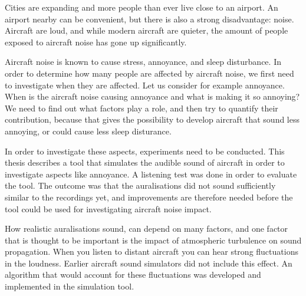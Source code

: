 Cities are expanding and more people than ever live close to an airport. An
airport nearby can be convenient, but there is also a strong disadvantage:
noise. Aircraft are loud, and while modern aircraft are quieter, the amount of
people exposed to aircraft noise has gone up significantly.

Aircraft noise is known to cause stress, annoyance, and sleep disturbance. In
order to determine how many people are affected by aircraft noise, we first need
to investigate when they are affected. Let us consider for example annoyance.
When is the aircraft noise causing annoyance and what is making it so annoying?
We need to find out what factors play a role, and then try to quantify their
contribution, because that gives the possibility to develop aircraft that sound
less annoying, or could cause less sleep disturance.

In order to investigate these aspects, experiments need to be conducted. This
thesis describes a tool that simulates the audible sound of aircraft in order to
investigate aspects like annoyance. A listening test was done in order to
evaluate the tool. The outcome was that the auralisations did not sound
sufficiently similar to the recordings yet, and improvements are therefore
needed before the tool could be used for investigating aircraft noise impact.

How realistic auralisations sound, can depend on many factors, and one factor that is
thought to be important is the impact of atmospheric turbulence on sound
propagation. When you listen to distant aircraft you can hear strong
fluctuations in the loudness. Earlier aircraft sound simulators did not include
this effect. An algorithm that would account for these fluctuations was
developed and implemented in the simulation tool.
